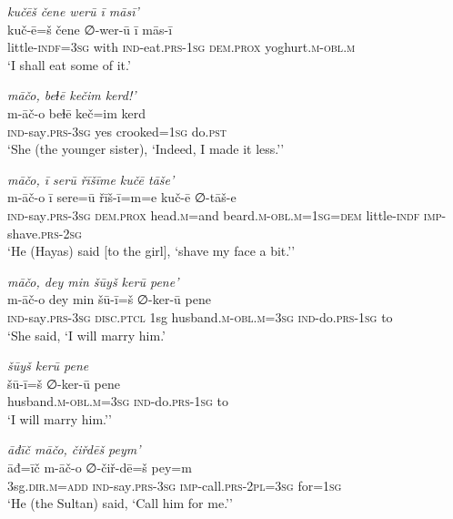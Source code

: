 \ea \label{ŽH.42}
\textit{kučēš čene werū ī māsī’} \\ 
\gll kuč-ē=š čene ∅-wer-ū ī mās-ī \\ 
 little\textsc{-indf}\textsc{=3sg} with \textsc{ind-}eat\textsc{.prs}\textsc{-1sg} \textsc{dem.prox} yoghurt\textsc{.m}\textsc{-obl}\textsc{.m} \\ 
\glt `I shall eat some of it.'
\z 
 
\ea \label{ŽH.49}
\textit{māčo, beɫē kečim kerd!’} \\ 
\gll m-āč-o beɫē keč=im kerd \\ 
 \textsc{ind-}say\textsc{.prs}\textsc{-3sg} yes crooked\textsc{=1sg} do\textsc{.pst} \\ 
\glt `She (the younger sister), ‘Indeed, I made it less.’'
\z 
 
\ea \label{ŽH.53}
\textit{māčo, ī serū řīšīme kučē tāše’} \\ 
\gll m-āč-o ī sere=ū řīš-ī=m=e kuč-ē ∅-tāš-e \\ 
 \textsc{ind-}say\textsc{.prs}\textsc{-3sg} \textsc{dem.prox} head\textsc{.m}=and beard\textsc{.m}\textsc{-obl}\textsc{.m}\textsc{=1sg}\textsc{=dem} little\textsc{-indf} \textsc{imp-}shave\textsc{.prs}-\textsc{2sg} \\ 
\glt `He (Hayas) said [to the girl], ‘shave my face a bit.’'
\z 
 
\ea \label{ŽH.59}
\textit{māčo, dey min šūyš kerū pene’} \\ 
\gll m-āč-o dey min šū-ī=š ∅-ker-ū pene \\ 
 \textsc{ind-}say\textsc{.prs}\textsc{-3sg} \textsc{disc.ptcl} 1sg husband\textsc{.m}\textsc{-obl}\textsc{.m}\textsc{=3sg} \textsc{ind-}do\textsc{.prs}\textsc{-1sg} to \\ 
\glt `She said, ‘I will marry him.'
\z 
 
\ea \label{ŽH.60}
\textit{šūyš kerū pene} \\ 
\gll šū-ī=š ∅-ker-ū pene \\ 
 husband\textsc{.m}\textsc{-obl}\textsc{.m}\textsc{=3sg} \textsc{ind-}do\textsc{.prs}\textsc{-1sg} to \\ 
\glt `I will marry him.’'
\z 
 
\ea \label{ŽH.67}
\textit{āđīč māčo, čiřdēš peym’} \\ 
\gll āđ=īč m-āč-o ∅-čiř-dē=š pey=m \\ 
 3sg\textsc{.dir}\textsc{.m}\textsc{=add} \textsc{ind-}say\textsc{.prs}\textsc{-3sg} \textsc{imp-}call\textsc{.prs}\textsc{-2pl}\textsc{=3sg} for\textsc{=1sg} \\ 
\glt `He (the Sultan) said, ‘Call him for me.’'
\z 
 

